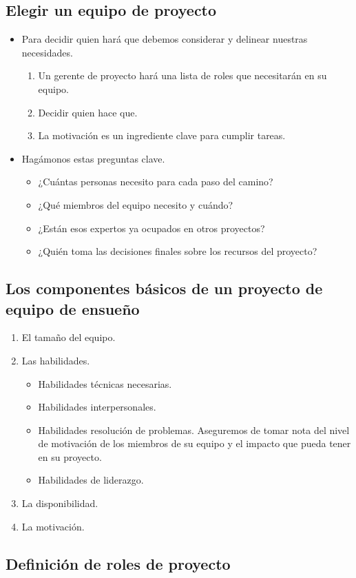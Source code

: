 \documentclass[10pt]{book}
\begin{document}
	\subsection{Elegir un equipo de proyecto}
	    
	    \begin{itemize}
		\item Para decidir quien hará que debemos considerar y delinear nuestras necesidades.
		    \begin{enumerate}
			\item Un gerente de proyecto hará una lista de roles que necesitarán en su equipo.
			\item Decidir quien hace que.
			\item La motivación es un ingrediente clave para cumplir tareas.
		    \end{enumerate}
		\item Hagámonos estas preguntas clave.
		    \begin{itemize}
			\item ¿Cuántas personas necesito para cada paso del camino?
			\item ¿Qué miembros del equipo necesito y cuándo?
			\item ¿Están esos expertos ya ocupados en otros proyectos?
			\item ¿Quién toma las decisiones finales sobre los recursos del proyecto?
		    \end{itemize}
	    \end{itemize}

	\subsection{Los componentes básicos de un proyecto de equipo de ensueño}
	    \begin{enumerate}
		\item El tamaño del equipo.
		\item Las habilidades.
		    \begin{itemize}
			\item Habilidades técnicas necesarias.
			\item Habilidades interpersonales.
			\item Habilidades resolución de problemas. Aseguremos de tomar nota del nivel de motivación de los miembros de su equipo y el impacto que pueda tener en su proyecto.
			\item Habilidades de liderazgo.
		    \end{itemize}
		\item La disponibilidad.
		\item La motivación.
	    \end{enumerate}

	\subsection{Definición de roles de proyecto}
\end{document}
